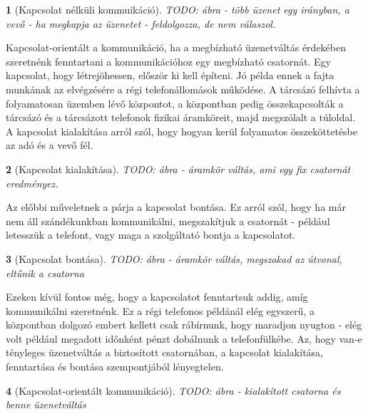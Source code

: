 \documentclass[a4paper, 12pt, oneside]{article}
\newtheorem*{defin}{}
\begin{document}
\begin{center}
\begin{defin}[Kapcsolat nélküli kommuikáció]
TODO: ábra - több üzenet egy irányban, a vevő - ha megkapja az üzenetet - feldolgozza, de nem válaszol.
\end{defin}
\end{center}

Kapcsolat-orientált a kommunikáció, ha a megbízható üzenetváltás érdekében szeretnénk fenntartani a kommunikációhoz egy megbízható csatornát. Egy kapcsolat, hogy létrejöhessen, először ki kell építeni. Jó példa ennek a fajta munkának az elvégzésére a régi telefonállomások működése. A tárcsázó felhívta a folyamatosan üzemben lévő központot, a központban pedig összekapcsolták a tárcsázó és a tárcsázott telefonok fizikai áramköreit, majd megszólalt a túloldal. A kapcsolat kialakítása arról szól, hogy hogyan kerül folyamatos összeköttetésbe az adó és a vevő fél.

\begin{center}
\begin{defin}[Kapcsolat kialakítása]
TODO: ábra - áramkör váltás, ami egy fix csatornát eredményez.
\end{defin}
\end{center}

Az előbbi műveletnek a párja a kapcsolat bontása. Ez arról szól, hogy ha már nem áll szándékunkban kommunikálni, megszakítjuk a csatornát - például letesszük a telefont, vagy maga a szolgáltató bontja a kapcsolatot.

\begin{center}
\begin{defin}[Kapcsolat bontása]
TODO: ábra - áramkör váltás, megszakad az útvonal, eltűnik a csatorna
\end{defin}
\end{center}

Ezeken kívül fontos még, hogy a kapcsolatot fenntartsuk addig, amíg kommunikálni szeretnénk. Ez a régi telefonos példánál elég egyszerű, a központban dolgozó embert kellett csak rábírnunk, hogy maradjon nyugton - elég volt például megadott időnként pénzt dobálnunk a telefonfülkébe. Az, hogy van-e tényleges üzenetváltás a biztosított csatornában, a kapcsolat kialakítása, fenntartása és bontása szempontjából lényegtelen.

\begin{center}
\begin{defin}[Kapcsolat-orientált kommunikáció]
TODO: ábra - kialakított csatorna és benne üzenetváltás
\end{defin}
\end{center}
\end{document}
